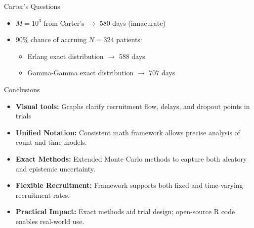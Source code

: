 \documentclass[english]{beamer}\usepackage[]{graphicx}\usepackage[]{xcolor}
\begin{document}
\begin{frame}{Carter's Questions}

\begin{itemize}
\item $M=10^3$ from Carter's $\rightarrow$ 580 days (innacurate)
\item 90\% chance of accruing $N=324$ patients: 
	\begin{itemize}
	\item Erlang exact distribution $\rightarrow$ 588 days
	\item Gamma-Gamma exact distribution $\rightarrow$ 707 days
	\end{itemize}
\end{itemize}
\end{frame}

\begin{frame}{Conclusions}

\begin{itemize}
\item \textbf{Visual tools:} Graphs clarify recruitment flow, delays, and dropout points in trials
\item \textbf{Unified Notation:} Consistent math framework allows precise analysis of count and time models.
\item \textbf{Exact Methods:} Extended Monte Carlo methods to capture both aleatory and epistemic uncertainty.
\item \textbf{Flexible Recruitment:} Framework supports both fixed and time-varying recruitment rates.
\item \textbf{Practical Impact:} Exact methods aid trial design; open-source R code enables real-world use.
\end{itemize}
\end{frame}
\end{document}
